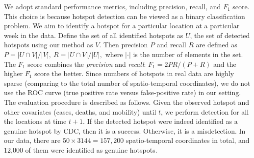 \documentclass[journal]{IEEEtran}
\begin{document}
We adopt standard performance metrics, including precision, recall, and $F_1$ score. This choice is because hotspot detection can be viewed as a binary classification problem. We aim to identify a hotspot for a particular location at a particular week in the data. 
Define the set of all identified hotspots as $U$, the set of detected hotspots using our method as $V$.
Then precision $P$ and recall $R$ are defined as
$
    P = |U \cap V|/|V|,~R = |U \cap V|/|U|,
$
where $|\cdot|$ is the number of elements in the set. 
The $F_1$ score combines the \emph{precision} and \emph{recall}: $F_1 = 2 P R / (P + R)$ and the higher $F_1$ score the better. Since numbers of hotspots in real data are highly sparse (comparing to the total number of spatio-temporal coordinates), we do not use the ROC curve (true positive rate versus false-positive rate) in our setting. 
The evaluation procedure is described as follows. Given the observed hotspot and other covariates (cases, deaths, and mobility) until $t$, we perform detection for all the locations at time $t+1$. If the detected hotspot were indeed identified as a genuine hotspot by CDC, then it is a success. Otherwise, it is a misdetection. In our data, there are $50 \times 3144 = 157,200$ spatio-temporal coordinates in total, and 12,000 of them were identified as genuine hotspots.
\end{document}
